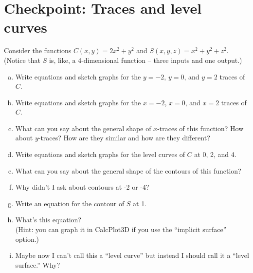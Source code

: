


%


\allowdisplaybreaks
\section{Checkpoint: Traces and level curves }
Consider the functions $C(x,y) = 2x^2 +y^2$ and $S(x,y,z) = x^2 + y^2 + z^2$. (Notice that $S$ is, like, a 4-dimensional function -- three inputs and one output.)

\begin{enumerate}[(a)]
    \item Write equations and sketch graphs for the $y=-2$, $y=0$, and $y=2$ traces of $C$.
    \item Write equations and sketch graphs for the $x=-2$, $x=0$, and $x=2$ traces of $C$.
    \item What can you say about the general shape of $x$-traces of this function? How about $y$-traces? How are they similar and how are they different?

\hrulefill
    \item Write equations and sketch graphs for the level curves of $C$ at 0, 2, and 4.
    \item What can you say about the general shape of the contours of this function?
    \item Why didn't I ask about contours at -2 or -4?

\hrulefill
    \item Write an equation for the contour of $S$ at 1.
    \item What's this equation? \\
    (Hint: you can graph it in CalcPlot3D if you use the ``implicit surface'' option.)
    \item Maybe now I can't call this a ``level curve'' but instead I should call it a ``level surface.'' Why?
\end{enumerate}
	
